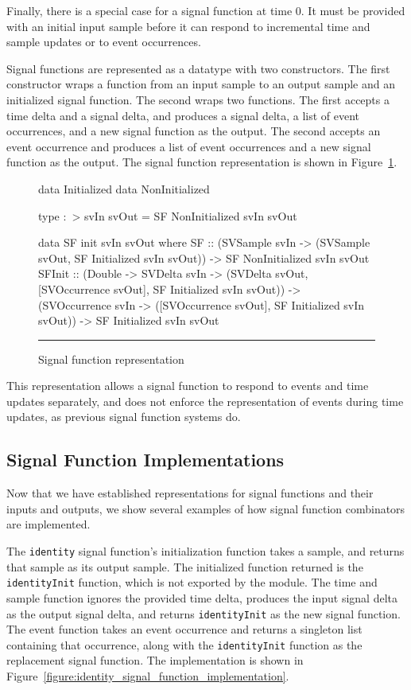 \documentclass[draft]{llncs}
\begin{document}
Finally, there is a special case for a signal function at time 0. It must be
provided with an initial input sample before it can respond to incremental time
and sample updates or to event occurrences.

Signal functions are represented as a datatype with two constructors. The first
constructor wraps a function from an input sample to an output sample and an
initialized signal function. The second wraps two functions. The first accepts
a time delta and a signal delta, and produces a signal delta, a list of event
occurrences, and a new signal function as the output. The second accepts an
event occurrence and produces a list of event occurrences and a new signal
function as the output. The signal function representation is shown in Figure~\ref{figure:signal_function_representation}.

\begin{figure}[t]
\begin{code}
data Initialized
data NonInitialized

type :~> svIn svOut = SF NonInitialized svIn svOut

data SF init svIn svOut where
  SF :: (SVSample svIn -> (SVSample svOut, SF Initialized svIn svOut))
        -> SF NonInitialized svIn svOut
  SFInit :: (Double -> SVDelta svIn 
             -> (SVDelta svOut, [SVOccurrence svOut],
                 SF Initialized svIn svOut))
            -> (SVOccurrence svIn -> ([SVOccurrence svOut],
                                      SF Initialized svIn svOut))
            -> SF Initialized svIn svOut
\end{code}
\hrule
\caption{Signal function representation}
\label{figure:signal_function_representation}
\end{figure}

This representation allows a signal function to respond to events and time
updates separately, and does not enforce the representation of events during
time updates, as previous signal function systems do.

\subsection{Signal Function Implementations}
\label{subsection:Signal_Function_Implementations}

Now that we have established representations for signal functions and their
inputs and outputs, we show several examples of how signal function combinators
are implemented.

The {\tt identity} signal function's initialization function takes a sample,
and returns that sample as its output sample. The initialized function returned
is the {\tt identityInit} function, which is not exported by the module.
The time and sample function ignores the provided time delta, produces the
input signal delta as the output signal delta, and returns {\tt identityInit} as
the new signal function. The event function takes an event occurrence and
returns a singleton list containing that occurrence, along with the
{\tt identityInit} function as the replacement signal function. The
implementation is shown in Figure~\ref{figure:identity_signal_function_implementation}.
\end{document}
